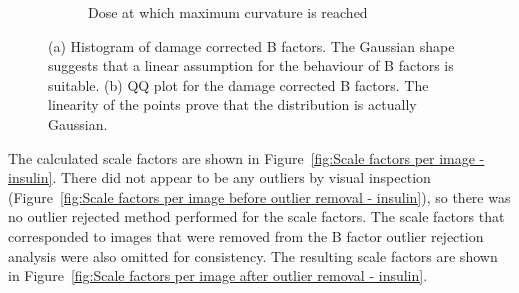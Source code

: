 \begin{figure}
\begin{subfigure}[b]{1.0\textwidth}
            \caption{Dose at which maximum curvature is reached}
            \label{fig:B factor QQ plot - insulin}
    \end{subfigure}
    \caption{(a) Histogram of damage corrected B factors.
    The Gaussian shape suggests that a linear assumption for the behaviour of B factors is suitable.
    (b) QQ plot for the damage corrected B factors.
    The linearity of the points prove that the distribution is actually Gaussian.}
    \label{fig:Gaussian B factor plots - insulin}
\end{figure}

The calculated scale factors are shown in Figure~\ref{fig:Scale factors per image - insulin}.
There did not appear to be any outliers by visual inspection (Figure~\ref{fig:Scale factors per image before outlier removal - insulin}), so there was no outlier rejected method performed for the scale factors.
The scale factors that corresponded to images that were removed from the B factor outlier rejection analysis were also omitted for consistency.
The resulting scale factors are shown in Figure~\ref{fig:Scale factors per image after outlier removal - insulin}.
